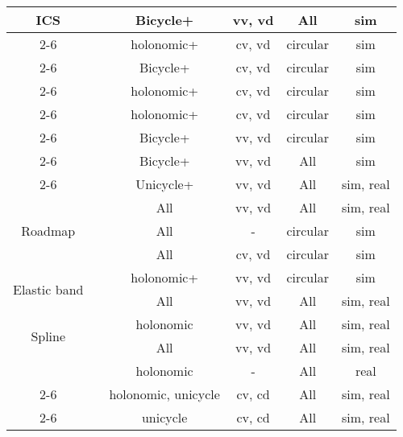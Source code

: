 \begin{table}[htpb]
\begin{tabular}{|c|c||c|c|c|c|}
        \multirow{9}{*}{ICS}&\cite{petti2005safe}  & Bicycle+ & vv, vd & All & sim \\\cmidrule{2-6}
                            &\cite{martinez2009collision}  & holonomic+ & cv, vd & circular & sim \\\cmidrule{2-6}
                            &\cite{martinez2008efficient}  & Bicycle+ & cv, vd & circular & sim \\\cmidrule{2-6}
                            &\cite{gal2009efficient}  & holonomic+ & cv, vd & circular & sim \\\cmidrule{2-6}
                            &\cite{shiller2010nonlinear}  & holonomic+ & cv, vd & circular & sim \\\cmidrule{2-6}
                            &\cite{althoff2012safety}  & Bicycle+ & vv, vd & circular & sim \\\cmidrule{2-6}
                            &\cite{bouraine2012provably} & Bicycle+ & vv, vd & All & sim \\\cmidrule{2-6}
                            &\cite{hernandez2015application}  & Unicycle+ & vv, vd & All & sim, real \\\midrule
        \multirow{3}{*}{Roadmap} &\cite{hsu2002randomized}  & All & vv, vd & All & sim, real \\\cmidrule{2-6}
                            &\cite{van2005roadmap}  & All & \-- & circular & sim \\\cmidrule{2-6}
                            &\cite{van2006anytime}  & All & cv, vd & circular & sim \\\midrule
        \multirow{2}{*}{Elastic band} &\cite{quinlan1993elastic}  & holonomic+ & vv, vd & circular & sim \\\cmidrule{2-6}
                            &\cite{rosmann2013efficient, rosmann2015planning}  & All & vv, vd & All & sim, real \\\midrule
        \multirow{2}{*}{Spline} &\cite{mercy2016real}  & holonomic & vv, vd & All & sim, real \\\cmidrule{2-6}
                            &\cite{mercy2017spline}  & All & vv, vd & All & sim, real \\\midrule
                            &\cite{minguez2004nearness}  & holonomic & \-- & All & real \\\cmidrule{2-6}
                            &\cite{ge2002dynamic}  & holonomic, unicycle & cv, cd & All & sim, real \\\cmidrule{2-6}
                            &\cite{savkin2013simple}  & unicycle & cv, cd & All & sim, real \\\midrule
    \end{tabular}


\end{table}
